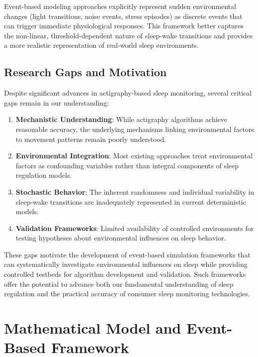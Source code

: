 \documentclass[conference]{IEEEtran}
\begin{document}
Event-based modeling approaches explicitly represent sudden environmental changes (light transitions, noise events, stress episodes) as discrete events that can trigger immediate physiological responses. This framework better captures the non-linear, threshold-dependent nature of sleep-wake transitions and provides a more realistic representation of real-world sleep environments.

\subsection{Research Gaps and Motivation}

Despite significant advances in actigraphy-based sleep monitoring, several critical gaps remain in our understanding:

\begin{enumerate}
	\item \textbf{Mechanistic Understanding}: While actigraphy algorithms achieve reasonable accuracy, the underlying mechanisms linking environmental factors to movement patterns remain poorly understood.

	\item \textbf{Environmental Integration}: Most existing approaches treat environmental factors as confounding variables rather than integral components of sleep regulation models.

	\item \textbf{Stochastic Behavior}: The inherent randomness and individual variability in sleep-wake transitions are inadequately represented in current deterministic models.

	\item \textbf{Validation Frameworks}: Limited availability of controlled environments for testing hypotheses about environmental influences on sleep behavior.
\end{enumerate}

These gaps motivate the development of event-based simulation frameworks that can systematically investigate environmental influences on sleep while providing controlled testbeds for algorithm development and validation. Such frameworks offer the potential to advance both our fundamental understanding of sleep regulation and the practical accuracy of consumer sleep monitoring technologies.


\section{Mathematical Model and Event-Based Framework}
\end{document}
